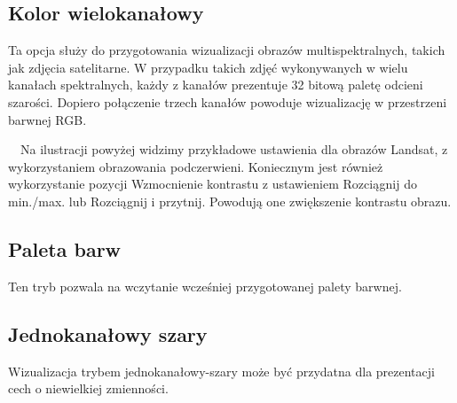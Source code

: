 \documentclass[12pt,a4paper]{book}
\begin{document}
\subsection{Kolor wielokanałowy}
Ta opcja służy do przygotowania wizualizacji obrazów multispektralnych, takich jak zdjęcia satelitarne. W przypadku takich zdjęć wykonywanych w wielu kanałach spektralnych, każdy z kanałów prezentuje 32 bitową paletę odcieni szarości. Dopiero połączenie trzech kanałów powoduje wizualizację w przestrzeni barwnej RGB. 

\ \ Na ilustracji powyżej widzimy przykładowe ustawienia dla obrazów Landsat, z wykorzystaniem obrazowania podczerwieni. Koniecznym jest również wykorzystanie pozycji Wzmocnienie kontrastu z ustawieniem Rozciągnij do min./max. lub Rozciągnij i przytnij. Powodują one zwiększenie kontrastu obrazu.

\subsection{Paleta barw}
Ten tryb pozwala na wczytanie wcześniej przygotowanej palety barwnej.

\subsection{Jednokanałowy szary}
Wizualizacja trybem jednokanałowy-szary może być przydatna dla prezentacji cech o niewielkiej zmienności.
\end{document}
